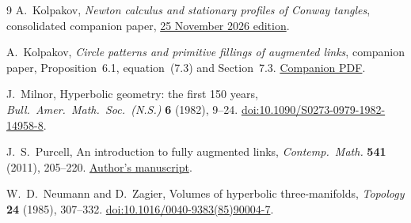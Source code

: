\begin{thebibliography}{9}
A.~Kolpakov, \emph{Newton calculus and stationary profiles of Conway tangles},
consolidated companion paper,
\href{https://github.com/sashakolpakov/murakamis_dream/blob/conway-series-2026-11-25/docs/papers/newton-calculus.pdf}{25 November 2026 edition}.

A.~Kolpakov, \emph{Circle patterns and primitive fillings of augmented links},
companion paper, Proposition~6.1, equation~(7.3) and Section~7.3.
\href{https://github.com/sashakolpakov/murakamis_dream/blob/conway-series-2026-11-25/docs/papers/marked-fillings.pdf}
{Companion PDF}.

J.~Milnor, Hyperbolic geometry: the first 150 years,
\emph{Bull.\ Amer.\ Math.\ Soc.\ (N.S.)} \textbf{6} (1982), 9--24.
\href{https://doi.org/10.1090/S0273-0979-1982-14958-8}
{doi:10.1090/S0273-0979-1982-14958-8}.

J.~S.~Purcell, An introduction to fully augmented links,
\emph{Contemp.\ Math.} \textbf{541} (2011), 205--220.
\href{https://users.monash.edu.au/~jpurcell/papers/expos-auglinks.pdf}
{Author's manuscript}.

W.~D.~Neumann and D.~Zagier, Volumes of hyperbolic three-manifolds,
\emph{Topology} \textbf{24} (1985), 307--332.
\href{https://doi.org/10.1016/0040-9383(85)90004-7}
{doi:10.1016/0040-9383(85)90004-7}.
\end{thebibliography}
